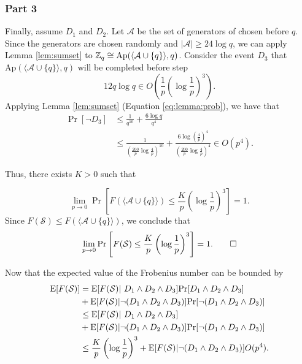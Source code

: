 \subsubsection*{Part 3}

\par Finally, assume $D_1$ and $D_2$. Let $\mathcal{A}$ be the set of generators of chosen before $q$. Since the generators are chosen randomly and $|\mathcal{A}| \geq 24\log q$, we can apply Lemma \ref{lem:sumset} to $\ZZ_q \cong \mathrm{Ap}(\langle\mathcal{A}\cup\{q\}\rangle, q)$. Consider the event $D_3$ that $\mathrm{Ap}(\langle\mathcal{A}\cup\{q\}\rangle, q)$ will be completed before step \[ 12q\log q \in O\left(\frac{1}{p}\left(\log \frac{1}{p}\right)^3\right).\] 
Applying Lemma \ref{lem:sumset} (Equation \ref{eq:lemma:prob}), we have that
\begin{align*}
\Pr[\lnot D_3] &\leq \frac{1}{q^{10}} + \frac{6\log q}{q^4} \\
&\leq \frac{1}{\left(\frac{200}{p}\log \frac{4}{p}\right)^{10}}
+ \frac{6\log\left(\frac{4}{p}\right)^4}{\left(\frac{200}{p}\log\frac{4}{p}\right)^4} \in O(p^4).
\end{align*}
\par 

Thus, there exists $K > 0$ such that 

\[\lim_{p \to  0} \Pr\left[F(\langle\mathcal{A}\cup \{q\}\rangle) \leq \frac{K}{p}\left(\log \frac{1}{p}\right)^3\right] = 1.\]
Since $F(\mathcal{S}) \leq F(\langle \mathcal{A}\cup\{q\}\rangle)$, we conclude that
\[\lim_{p \to 0}\Pr\left[F(\mathcal{S}) \leq \frac{K}{p}\left(\log \frac{1}{p}\right)^3\right] = 1.\qed\]

Now that the expected value of the Frobenius number can be bounded by
\begin{align*}
\EE[F(\mathcal{S})] &= \EE[F(\mathcal{S}) | D_1 \land D_2 \land D_3] \Pr[D_1 \land D_2 \land D_3]
\\&+ \EE[F(\mathcal{S}) |\lnot(D_1 \land D_2 \land D_3)] \Pr[\lnot(D_1 \land D_2 \land D_3)] 
\\&\leq \EE[F(\mathcal{S}) | D_1 \land D_2 \land D_3] 
\\&+ \EE[F(\mathcal{S}) |\lnot(D_1 \land D_2 \land D_3)] \Pr[\lnot(D_1 \land D_2 \land D_3)]
\\&\leq \frac{K}{p}\left(\log \frac{1}{p}\right)^3 + \EE[F(\mathcal{S}) |\lnot(D_1 \land D_2 \land D_3)]O(p^4).
\end{align*}

